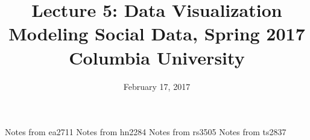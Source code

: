 \documentclass{article}
\title{
Lecture 5: Data Visualization \\  %
Modeling Social Data, Spring 2017 \\   %
Columbia University                    %
}
\date{February 17, 2017}                %
\makeatletter
\let\org@subfile
\renewcommand*{}[1]{%
  \filename@parse{#1}%
  \expandafter
  \graphicspath\expandafter{\expandafter{\filename@area}}%
  \org@subfile{#1}%
}
\makeatother
\begin{document}
\maketitle


\pagebreak \newpage \noindent\Huge{Notes from ea2711} \normalsize \setcounter{section}{0} 
\pagebreak \newpage \noindent\Huge{Notes from hn2284} \normalsize \setcounter{section}{0} 
\pagebreak \newpage \noindent\Huge{Notes from rs3505} \normalsize \setcounter{section}{0} 
\pagebreak \newpage \noindent\Huge{Notes from ts2837} \normalsize \setcounter{section}{0} 
\end{document}

